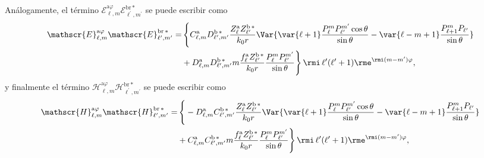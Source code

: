 %
Análogamente, el término $\mathscr{E}_{\ell, m}^{\text{a}\varphi}\mathscr{E}_{\ell^{\prime}, m^{\prime}}^{\text{br}\,*}$ se puede escribir como
\begin{align}
\mathscr{E}_{\ell, m}^{\text{a}\varphi}\mathscr{E}_{\ell^{\prime}, m^{\prime}}^{\text{br}\,*} =& \, \Bigg\{ C_{\ell, m}^{\rm a} D_{\ell^{\prime}, m^{\prime}}^{\rm b \, *} \frac{Z_{\ell}^{\rm a} Z_{\ell^{\prime}}^{\rm b \, *}}{k_0 r} \Var{\var{\ell +1} \frac{P_{\ell}^{m} P_{\ell^{\prime}}^{m^{\prime}}\cos\theta}{\sin\theta} -\var{\ell - m +1}\frac{P_{\ell+1}^m P_{\ell^{\prime}}}{\sin\theta} }\nonumber\\
& + D_{\ell, m}^{\rm a} D_{\ell^{\prime}, m^{\prime}}^{\rm b \, *} m \frac{f_{\ell}^{\rm a} Z_{\ell^{\prime}}^{\rm b\, *}}{k_0 r} \frac{P_{\ell}^{m} P_{\ell^{\prime}}^{m^{\prime}}}{\sin\theta} \Bigg\} \, \rmi \, \ell^{\prime}(\ell^{\prime}+1)  \rme^{\rmi (m-m^{\prime})\varphi },
\end{align}
%
y finalmente el término $\mathscr{H}_{\ell, m}^{\text{a}\varphi}\mathscr{H}_{\ell^{\prime}, m^{\prime}}^{\text{br}\,*}$ se puede escribir como
\begin{align}
\mathscr{H}_{\ell, m}^{\text{a}\varphi}\mathscr{H}_{\ell^{\prime}, m^{\prime}}^{\text{br}\,*} =& \, \Bigg\{ -D_{\ell, m}^{\rm a} C_{\ell^{\prime}, m^{\prime}}^{\rm b \, *} \frac{Z_{\ell}^{\rm a} Z_{\ell^{\prime}}^{\rm b \, *}}{k_0 r} \Var{\var{\ell +1} \frac{P_{\ell}^{m} P_{\ell^{\prime}}^{m^{\prime}}\cos\theta}{\sin\theta} -\var{\ell - m +1}\frac{P_{\ell+1}^m P_{\ell^{\prime}}}{\sin\theta} }\nonumber\\
& + C_{\ell, m}^{\rm a} C_{\ell^{\prime}, m^{\prime}}^{\rm b \, *} m \frac{f_{\ell}^{\rm a} Z_{\ell^{\prime}}^{\rm b\, *}}{k_0 r} \frac{P_{\ell}^{m} P_{\ell^{\prime}}^{m^{\prime}}}{\sin\theta} \Bigg\} \, \rmi \, \ell^{\prime}(\ell^{\prime}+1)  \rme^{\rmi (m-m^{\prime})\varphi },
\end{align}

